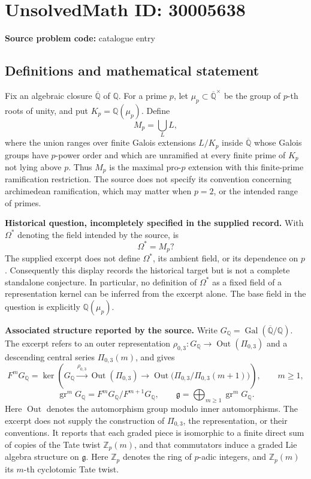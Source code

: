 \documentclass[11pt]{article}
\newcommand{\Z}{\mathbb{Z}}
\newcommand{\Q}{\mathbb{Q}}
\begin{document}
\section*{UnsolvedMath ID: 30005638}
\textbf{Source problem code:} catalogue entry
\subsection{Definitions and mathematical statement}
Fix an algebraic closure \(\overline{\Q}\) of \(\Q\). For a prime \(p\), let \(\mu_p\subset\overline{\Q}^{\times}\) be the group of \(p\)-th roots of unity, and put \(K_p=\Q(\mu_p)\). Define
\[
M_p=\bigcup_{L}L,
\]
where the union ranges over finite Galois extensions \(L/K_p\) inside \(\overline{\Q}\) whose Galois groups have \(p\)-power order and which are unramified at every finite prime of \(K_p\) not lying above \(p\). Thus \(M_p\) is the maximal pro-\(p\) extension with this finite-prime ramification restriction. The source does not specify its convention concerning archimedean ramification, which may matter when \(p=2\), or the intended range of primes.

\textbf{Historical question, incompletely specified in the supplied record.} With \(\Omega^{*}\) denoting the field intended by the source, is
\[
\Omega^{*}=M_p?
\]
The supplied excerpt does not define \(\Omega^{*}\), its ambient field, or its dependence on \(p\). Consequently this display records the historical target but is not a complete standalone conjecture. In particular, no definition of \(\Omega^{*}\) as a fixed field of a representation kernel can be inferred from the excerpt alone. The base field in the question is explicitly \(\Q(\mu_p)\).

\textbf{Associated structure reported by the source.} Write \(G_{\Q}=\operatorname{Gal}(\overline{\Q}/\Q)\). The excerpt refers to an outer representation \(\rho_{0,3}:G_{\Q}\to\operatorname{Out}(\Pi_{0,3})\) and a descending central series \(\Pi_{0,3}(m)\), and gives
\[
F^mG_{\Q}=\ker\!\left(G_{\Q}\xrightarrow{\rho_{0,3}}\operatorname{Out}(\Pi_{0,3})\longrightarrow\operatorname{Out}\bigl(\Pi_{0,3}/\Pi_{0,3}(m+1)\bigr)\right),\qquad m\geq1,
\]
\[
\operatorname{gr}^mG_{\Q}=F^mG_{\Q}/F^{m+1}G_{\Q},\qquad
\mathfrak g=\bigoplus_{m\geq1}\operatorname{gr}^mG_{\Q}.
\]
Here \(\operatorname{Out}\) denotes the automorphism group modulo inner automorphisms. The excerpt does not supply the construction of \(\Pi_{0,3}\), the representation, or their conventions. It reports that each graded piece is isomorphic to a finite direct sum of copies of the Tate twist \(\Z_p(m)\), and that commutators induce a graded Lie algebra structure on \(\mathfrak g\). Here \(\Z_p\) denotes the ring of \(p\)-adic integers, and \(\Z_p(m)\) its \(m\)-th cyclotomic Tate twist.
\end{document}

